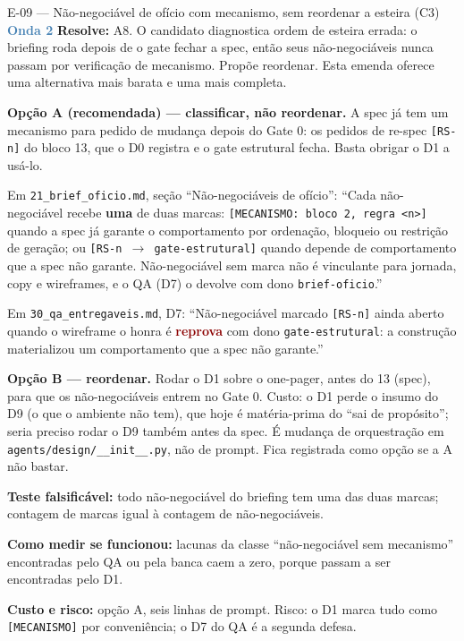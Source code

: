 \documentclass[11pt,a4paper]{article}
\newcommand{\rep}{\textcolor{DarkRed}{\textbf{reprova}}}
\newcommand{\onda}[1]{\textcolor{SteelBlue}{\textbf{Onda #1}}}
\begin{document}
\begin{emendabox}{E-09 --- Não-negociável de ofício com mecanismo, sem reordenar a esteira (C3) \hfill \onda{2}}
\textbf{Resolve:} A8. O candidato diagnostica ordem de esteira errada: o briefing roda depois de o
gate fechar a spec, então seus não-negociáveis nunca passam por verificação de mecanismo. Propõe
reordenar. Esta emenda oferece uma alternativa mais barata e uma mais completa.

\textbf{Opção A (recomendada) --- classificar, não reordenar.} A spec já tem um mecanismo para
pedido de mudança depois do Gate 0: os pedidos de re-spec \texttt{[RS-n]} do bloco 13, que o D0
registra e o gate estrutural fecha. Basta obrigar o D1 a usá-lo.

\begin{depoisbox}\small
Em \texttt{21\_brief\_oficio.md}, seção ``Não-negociáveis de ofício'': ``Cada não-negociável
recebe \textbf{uma} de duas marcas: \texttt{[MECANISMO: bloco 2, regra <n>]} quando a spec já
garante o comportamento por ordenação, bloqueio ou restrição de geração; ou
\texttt{[RS-n $\to$ gate-estrutural]} quando depende de comportamento que a spec não garante.
Não-negociável sem marca não é vinculante para jornada, copy e wireframes, e o QA (D7) o devolve
com dono \texttt{brief-oficio}.''

Em \texttt{30\_qa\_entregaveis.md}, D7: ``Não-negociável marcado \texttt{[RS-n]} ainda aberto
quando o wireframe o honra é \rep{} com dono \texttt{gate-estrutural}: a construção materializou um
comportamento que a spec não garante.''
\end{depoisbox}

\textbf{Opção B --- reordenar.} Rodar o D1 sobre o one-pager, antes do 13 (spec), para que os
não-negociáveis entrem no Gate 0. Custo: o D1 perde o insumo do D9 (o que o ambiente não tem), que
hoje é matéria-prima do ``sai de propósito''; seria preciso rodar o D9 também antes da spec. É
mudança de orquestração em \texttt{agents/design/\_\_init\_\_.py}, não de prompt. Fica registrada
como opção se a A não bastar.

\textbf{Teste falsificável:} todo não-negociável do briefing tem uma das duas marcas; contagem de
marcas igual à contagem de não-negociáveis.

\textbf{Como medir se funcionou:} lacunas da classe ``não-negociável sem mecanismo'' encontradas
pelo QA ou pela banca caem a zero, porque passam a ser encontradas pelo D1.

\textbf{Custo e risco:} opção A, seis linhas de prompt. Risco: o D1 marca tudo como
\texttt{[MECANISMO]} por conveniência; o D7 do QA é a segunda defesa.
\end{emendabox}
\end{document}

